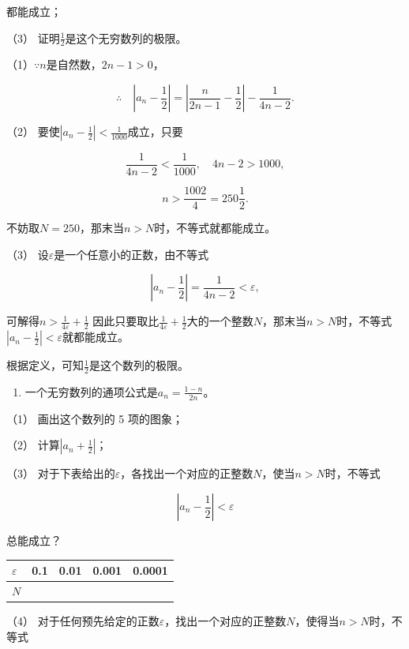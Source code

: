 都能成立；

（3） 证明\(\frac{1}{2}\)是这个无穷数列的极限。


（1）\(\because n\)是自然数，\(2n - 1 > 0\)，

\[
\therefore \quad \left| a_{n} - \frac{1}{2} \right| = \left| \frac{n}{2 n - 1} - \frac{1}{2} \right| - \frac{1}{4 n - 2}.
\]

（2） 要使\(\left|a_{n}-\frac{1}{2}\right|<\frac{1}{1000}\)成立，只要

\[
\frac{1}{4 n - 2} < \frac{1}{1000}, \quad 4 n - 2 > 1000,
\]

\[
n > \frac{1002}{4} = 250 \frac{1}{2}.
\]

不妨取\(N = 250\)，那末当\(n > N\)时，不等式就都能成立。

（3） 设\(\varepsilon\)是一个任意小的正数，由不等式

\[
\left| a_{n} - \frac{1}{2} \right| = \frac{1}{4 n - 2} < \varepsilon,
\]

可解得\(n > \frac{1}{4\varepsilon} +\frac{1}{2}\)
因此只要取比\(\frac{1}{4\varepsilon} +\frac{1}{2}\)大的一个整数\(N\)，那末当\(n > N\)时，不等式\(\left|a_n - \frac{1}{2}\right| < \varepsilon\)就都能成立。

根据定义，可知\(\frac{1}{2}\)是这个数列的极限。

\begin{enumerate}
\item
  一个无穷数列的通项公式是\(a_{n} = \frac{1 - n}{2n}\)。
\end{enumerate}

（1） 画出这个数列的 5 项的图象；

（2） 计算\(\left|a_{n}+\frac{1}{2}\right|\)；

（3）
对于下表给出的\(\varepsilon\)，各找出一个对应的正整数\(N\)，使当\(n > N\)时，不等式

\[
\left| a_{n} - \frac{1}{2} \right| < \varepsilon
\]

总能成立？

{\def\LTcaptype{none} %
\begin{longtable}[]{@{}lllll@{}}
\toprule\noalign{}
\(\varepsilon\) & 0.1 & 0.01 & 0.001 & 0.0001 \\
\midrule\noalign{}
\endhead
\bottomrule\noalign{}
\endlastfoot
\(N\) & & & & \\
\end{longtable}
}

（4）
对于任何预先给定的正数\(\varepsilon\)，找出一个对应的正整数\(N\)，使得当\(n > N\)时，不等式

